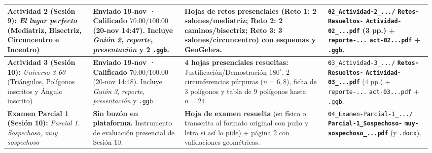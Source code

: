 \documentclass[spanish,letterpaper,oneside]{article}
\begin{document}
{\begin{longtable}{|>{\raggedright\arraybackslash}p{}|>{\raggedright\arraybackslash}p{}|>{\raggedright\arraybackslash}p{}|>{\raggedright\arraybackslash}p{}|}
\textbf{Actividad 2 (Sesión 9):} \textit{El lugar perfecto} (Mediatriz, Bisectriz, Circuncentro e Incentro) &
\textbf{Enviado 19-nov · Calificado $70.00/100.00$} (20-nov 14:47). Incluye \textit{Guión 2}, \textit{reporte}, \textit{presentación} y 2 \texttt{.ggb}. &
\textbf{Hojas de retos presenciales} (Reto 1: 2 salones/mediatriz; Reto 2: 2 caminos/bisectriz; Reto 3: 3 salones/circuncentro) con esquemas y GeoGebra. &
\texttt{02\_Actividad-2\_.../}\newline
\textbf{\texttt{Retos-Resueltos-}}\newline
\textbf{\texttt{Actividad-02\_...pdf}}\newline
(3 pp.) + \texttt{reporte-...}\newline
\texttt{act-02...pdf} + \texttt{.ggb}. \\\hline

\textbf{Actividad 3 (Sesión 10):} \textit{Universo 3-60} (Triángulos, Polígonos inscritos y Ángulo inscrito) &
\textbf{Enviado 19-nov · Calificado $70.00/100.00$} (20-nov 14:48). Incluye \textit{Guión 3}, \textit{reporte}, \textit{presentación} y \texttt{.ggb}. &
\textbf{4 hojas presenciales resueltas:} Justificación/Demostración $180^\circ$, 2 circunferencias púrpuras ($n=6,8$), ficha de 3 polígonos y tabla de 9 polígonos hasta $n=24$. &
\texttt{03\_Actividad-3\_.../}\newline
\textbf{\texttt{Retos-Resueltos-}}\newline
\textbf{\texttt{Actividad-03\_...pdf}}\newline
(4 pp.) + \texttt{reporte-...}\newline
\texttt{act-03...pdf} + \texttt{.ggb}. \\\hline

\textbf{Examen Parcial 1 (Sesión 10):} \textit{Parcial 1. Sospechoso, muy sospechoso} &
\textbf{Sin buzón en plataforma.} Instrumento de evaluación presencial de Sesión 10. &
\textbf{Hoja de examen resuelta} (en físico o transcrita al formato original con puño y letra si así lo pide) + página 2 con validaciones geométricas. &
\texttt{04\_Examen-Parcial-1\_.../}\newline
\textbf{\texttt{Parcial-1\_Sospechoso-}}\newline
\textbf{\texttt{muy-sospechoso\_...pdf}}\newline
(y \texttt{.docx}). \\\hline


\end{longtable}}
\end{document}
